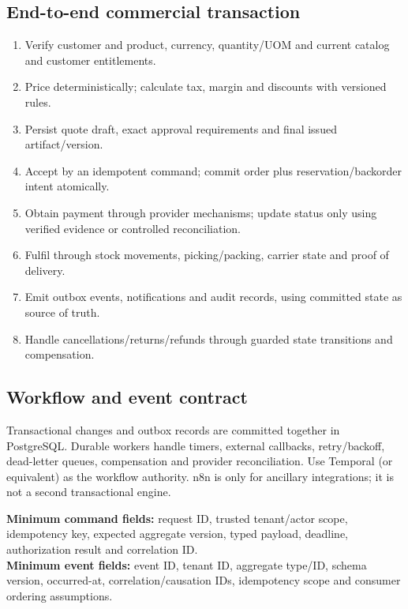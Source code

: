 \documentclass[10.5pt,a4paper,oneside]{article}
\begin{document}
\subsection{End-to-end commercial transaction}
\begin{enumerate}
\item Verify customer and product, currency, quantity/UOM and current catalog and customer entitlements.
\item Price deterministically; calculate tax, margin and discounts with versioned rules.
\item Persist quote draft, exact approval requirements and final issued artifact/version.
\item Accept by an idempotent command; commit order plus reservation/backorder intent atomically.
\item Obtain payment through provider mechanisms; update status only using verified evidence or controlled reconciliation.
\item Fulfil through stock movements, picking/packing, carrier state and proof of delivery.
\item Emit outbox events, notifications and audit records, using committed state as source of truth.
\item Handle cancellations/returns/refunds through guarded state transitions and compensation.
\end{enumerate}
\subsection{Workflow and event contract}
Transactional changes and outbox records are committed together in PostgreSQL. Durable workers handle timers, external callbacks, retry/backoff, dead-letter queues, compensation and provider reconciliation. Use Temporal (or equivalent) as the workflow authority. n8n is only for ancillary integrations; it is not a second transactional engine.
\begin{keybox}
\textbf{Minimum command fields:} request ID, trusted tenant/actor scope, idempotency key, expected aggregate version, typed payload, deadline, authorization result and correlation ID.\\
\textbf{Minimum event fields:} event ID, tenant ID, aggregate type/ID, schema version, occurred-at, correlation/causation IDs, idempotency scope and consumer ordering assumptions.
\end{keybox}
\end{document}

